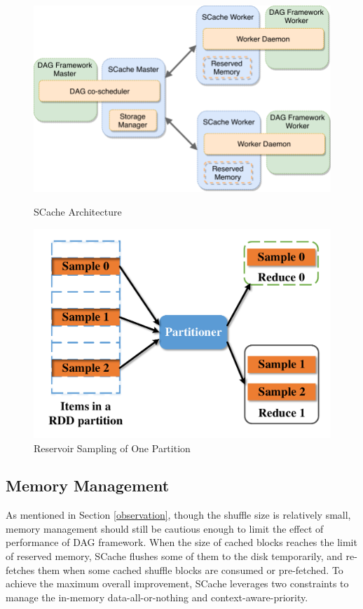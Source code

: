 \begin{figure}
	\centering
	\begin{minipage}{.47\textwidth}
		\centering
		\includegraphics[width=\linewidth]{fig/architecture}
		\caption{\color{blue}SCache Architecture}
		\label{fig:architecture}
	\end{minipage}\hfill
	\begin{minipage}{.42\textwidth}
		\centering
		\includegraphics[width=\linewidth]{fig/sample}
		\caption{Reservoir Sampling of One Partition}
		\label{fig:sample}
	\end{minipage}
\end{figure}

\subsection{Memory Management}\label{memorymanage}
As mentioned in Section \ref{observation}, though the shuffle size is relatively small, memory management should still be cautious enough to limit the effect of performance of DAG framework.
When the size of cached blocks reaches the limit of reserved memory, SCache flushes some of them to the disk temporarily, and re-fetches them when some cached shuffle blocks are consumed or pre-fetched. 
To achieve the maximum overall improvement, SCache leverages two constraints to manage the in-memory data-all-or-nothing and context-aware-priority.



